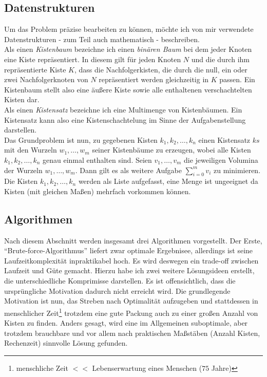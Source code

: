 \subsection{Datenstrukturen}
 Um das Problem präzise bearbeiten zu können, möchte ich von mir verwendete Datenstrukturen - zum Teil auch mathematisch - beschreiben.\\
 Als einen \emph{Kistenbaum} bezeichne ich einen \emph{binären Baum} bei dem jeder Knoten eine Kiste repräsentiert.
 In diesem gilt für jeden Knoten $N$ und die durch ihm repräsentierte Kiste $K$, dass die Nachfolgerkisten,
 die durch die null, ein oder zwei Nachfolgerknoten von $N$ repräsentiert werden gleichzeitig in $K$ passen.
 Ein Kistenbaum stellt also eine äußere Kiste sowie alle enthaltenen verschachtelten Kisten dar.\\
 Als einen \emph{Kistensatz} bezeichne ich eine Multimenge von Kistenbäumen.
 Ein Kistensatz kann also eine Kistenschachtelung im Sinne der Aufgabenstellung darstellen.\\
 Das Grundproblem ist nun, zu gegebenen Kisten $k_1,k_2,\dots,k_n$
 einen Kistensatz $ks$ mit den Wurzeln $w_1,\dots,w_m$ seiner Kistenbäume zu erzeugen, wobei alle Kisten $k_1,k_2,\dots,k_n$ genau einmal enthalten sind.
 Seien $v_1,\dots,v_m$ die jeweiligen Volumina der Wurzeln $w_1,\dots,w_m$. Dann gilt es als weitere Aufgabe $\sum_{i=0}^{m}{v_i}$ zu minimieren.\\
 Die Kisten $k_1,k_2,\dots,k_n$ werden als Liste aufgefasst, eine Menge ist ungeeignet da Kisten (mit gleichen Maßen) mehrfach vorkommen können.
\subsection{Algorithmen}
 Nach diesem Abschnitt werden insgesamt drei Algorithmen vorgestellt.
 Der Erste, ``Brute-force-Algorithmus'' liefert zwar optimale Ergebnisee, allerdings ist seine Laufzeitkomplexität inpraktikabel hoch.
 Es wird deswegen ein trade-off zwischen Laufzeit und Güte gemacht.
 Hierzu habe ich zwei weitere Lösungsideen erstellt, die unterschiedliche Komprimisse darstellen.
 Es ist offensichtlich, dass die ursprüngliche Motivation dadurch nicht erreicht wird.
 Die grundlegende Motivation ist nun,
 das Streben nach Optimalität aufzugeben und stattdessen in menschlicher Zeit\footnote{menschliche Zeit $<<$ Lebenserwartung eines Menschen ($75$ Jahre)}
  trotzdem eine gute Packung auch zu einer großen Anzahl von Kisten zu finden.
 Anders gesagt, wird eine im Allgemeinen suboptimale, aber trotzdem brauchbare und vor allem nach praktischen Maßstäben (Anzahl Kisten, Rechenzeit) sinnvolle Lösung gefunden.
